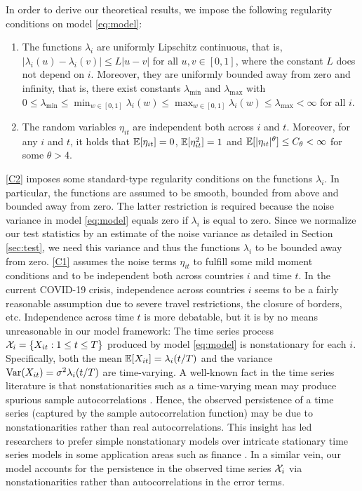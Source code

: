 \documentclass[a4paper,12pt]{article}
\numberwithin{equation}{section}
\begin{document}
In order to derive our theoretical results, we impose the following regularity conditions on model \eqref{eq:model}:
\begin{enumerate}[label=(C\arabic*),leftmargin=1.0cm]
\item \label{C2} The functions $\lambda_i$ are uniformly Lipschitz continuous, that is, $|\lambda_i(u) - \lambda_i(v)| \le L |u-v|$ for all $u, v \in [0,1]$, where the constant $L$ does not depend on $i$. Moreover, they are uniformly bounded away from zero and infinity, that is, there exist constants $\lambda_{\min}$ and $\lambda_{\max}$ with $0 \le \lambda_{\min} \le \min_{w \in [0,1]} \lambda_i(w) \le \max_{w \in [0,1]} \lambda_i(w) \le \lambda_{\max} < \infty$ for all $i$. 
\item \label{C1} The random variables $\eta_{it}$ are independent both across $i$ and $t$. Moreover, for any $i$ and $t$, it holds that $\mathbb{E}[\eta_{it}] = 0$, $\mathbb{E}[\eta_{it}^2] = 1$ and $\mathbb{E}[|\eta_{it}|^\theta] \le C_\theta < \infty$ for some $\theta > 4$. 
\end{enumerate}
\pagebreak
\ref{C2} imposes some standard-type regularity conditions on the functions $\lambda_i$. In particular, the functions are assumed to be smooth, bounded from above and bounded away from zero. The latter restriction is required because the noise variance in model \eqref{eq:model} equals zero if $\lambda_i$ is equal to zero. Since we normalize our test statistics by an estimate of the noise variance as detailed in Section \ref{sec:test}, we need this variance and thus the functions $\lambda_i$ to be bounded away from zero. \ref{C1} assumes the noise terms $\eta_{it}$ to fulfill some mild moment conditions and to be independent both across countries $i$ and time $t$. In the current COVID-19 crisis, independence across countries $i$ seems to be a fairly reasonable assumption due to severe travel restrictions, the closure of borders, etc. Independence across time $t$ is more debatable, but it is by no means unreasonable in our model framework: The time series process $\mathcal{X}_i = \{X_{it}: 1 \le t \le T\}$ produced by model \eqref{eq:model} is nonstationary for each $i$. Specifically, both the mean $\mathbb{E}[X_{it}] = \lambda_i(t/T)$ and the variance $\textnormal{Var}(X_{it}) = \sigma^2 \lambda_i(t/T)$ are time-varying. A well-known fact in the time series literature is that nonstationarities such as a time-varying mean may produce spurious sample autocorrelations \citep[cp.\ e.g.][]{MikoschStarica2004, Fryzlewicz2008}. Hence, the observed persistence of a time series (captured by the sample autocorrelation function) may be due to nonstationarities rather than real autocorrelations. This insight has led researchers to prefer simple nonstationary models over intricate stationary time series models in some application areas such as finance \citep[cp.][]{MikoschStarica2000, MikoschStarica2004, Fryzlewicz2006, HafnerLinton2010}. In a similar vein, our model accounts for the persistence in the observed time series $\mathcal{X}_i$ via nonstationarities rather than autocorrelations in the error terms. 
\end{document}
